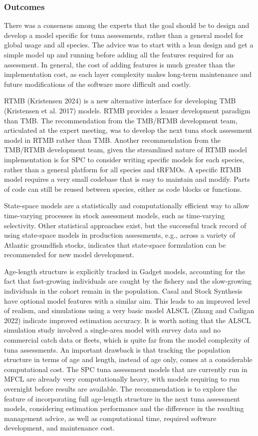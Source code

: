 \documentclass{SCreport}
\begin{document}
\subsubsection{Outcomes}

There was a consensus among the experts that the goal should be to design and
develop a model specific for tuna assessments, rather than a general model for
global usage and all species. The advice was to start with a lean design and get
a simple model up and running before adding all the features required for an
assessment. In general, the cost of adding features is much greater than the
implementation cost, as each layer complexity makes long-term maintenance and
future modifications of the software more difficult and costly.

RTMB (Kristensen 2024) is a new alternative interface for developing TMB
(Kristensen et al. 2017) models. RTMB provides a leaner development paradigm
than TMB. The recommendation from the TMB/RTMB development team, articulated at
the expert meeting, was to develop the next tuna stock assessment model in RTMB
rather than TMB. Another recommendation from the TMB/RTMB development team,
given the streamlined nature of RTMB model implementation is for SPC to consider
writing specific models for each species, rather than a general platform for all
species and tRFMOs. A specific RTMB model requires a very small codebase that is
easy to maintain and modify. Parts of code can still be reused between species,
either as code blocks or functions.

State-space models are a statistically and computationally efficient way to
allow time-varying processes in stock assessment models, such as time-varying
selectivity. Other statistical approaches exist, but the successful track record
of using state-space models in production assessments, e.g., across a variety of
Atlantic groundfish stocks, indicates that state-space formulation can be
recommended for new model development.

Age-length structure is explicitly tracked in Gadget models, accounting for the
fact that fast-growing individuals are caught by the fishery and the
slow-growing individuals in the cohort remain in the population. Casal and Stock
Synthesis have optional model features with a similar aim. This leads to an
improved level of realism, and simulations using a very basic model ALSCL (Zhang
and Cadigan 2022) indicate improved estimation accuracy. It is worth noting that
the ALSCL simulation study involved a single-area model with survey data and no
commercial catch data or fleets, which is quite far from the model complexity of
tuna assessments. An important drawback is that tracking the population
structure in terms of age and length, instead of age only, comes at a
considerable computational cost. The SPC tuna assessment models that are
currently run in MFCL are already very computationally heavy, with models
requiring to run overnight before results are available. The recommendation is
to explore the feature of incorporating full age-length structure in the next
tuna assessment models, considering estimation performance and the difference in
the resulting management advice, as well as computational time, required
software development, and maintenance cost.
\end{document}
